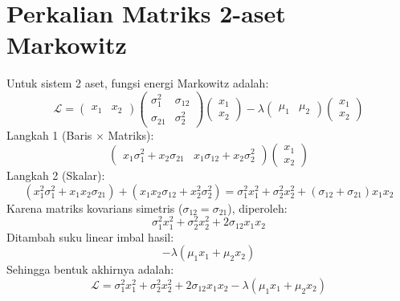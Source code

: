 \section{Perkalian Matriks 2-aset Markowitz}
Untuk sistem 2 aset, fungsi energi Markowitz adalah:
\begin{equation}
\mathcal{L} = \begin{pmatrix} x_1 & x_2 \end{pmatrix} \begin{pmatrix} \sigma_1^2 & \sigma_{12} \\ \sigma_{21} & \sigma_2^2 \end{pmatrix} \begin{pmatrix} x_1 \\ x_2 \end{pmatrix} - \lambda \begin{pmatrix} \mu_1 & \mu_2 \end{pmatrix} \begin{pmatrix} x_1 \\ x_2 \end{pmatrix}
\end{equation}
Langkah 1 (Baris $\times$ Matriks):
\begin{equation}
\begin{pmatrix} x_1 \sigma_1^2 + x_2 \sigma_{21} & x_1 \sigma_{12} + x_2 \sigma_2^2 \end{pmatrix} \begin{pmatrix} x_1 \\ x_2 \end{pmatrix}
\end{equation}
Langkah 2 (Skalar):
\begin{equation}
(x_1^2 \sigma_1^2 + x_1 x_2 \sigma_{21}) + (x_1 x_2 \sigma_{12} + x_2^2 \sigma_2^2) = \sigma_1^2 x_1^2 + \sigma_2^2 x_2^2 + (\sigma_{12} + \sigma_{21}) x_1 x_2
\end{equation}
Karena matriks kovarians simetris ($\sigma_{12} = \sigma_{21}$), diperoleh:
\begin{equation}
\sigma_1^2 x_1^2 + \sigma_2^2 x_2^2 + 2\sigma_{12} x_1 x_2
\end{equation}
Ditambah suku linear imbal hasil:
\begin{equation}
-\lambda(\mu_1 x_1 + \mu_2 x_2)
\end{equation}
Sehingga bentuk akhirnya adalah:
\begin{equation}
\mathcal{L} = \sigma_1^2 x_1^2 + \sigma_2^2 x_2^2 + 2\sigma_{12}x_1 x_2 - \lambda(\mu_1 x_1 + \mu_2 x_2)
\end{equation}
